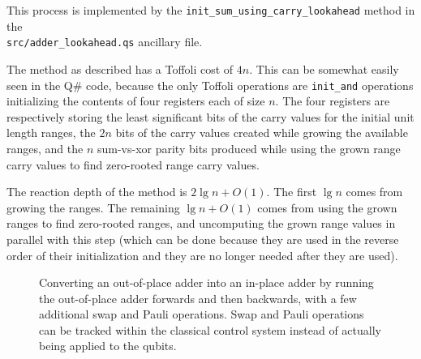 \documentclass[onecolumn,unpublished]{quantumarticle}
\theoremstyle{definition}
\theoremstyle{definition}
\theoremstyle{definition}
\begin{document}
This process is implemented by the \texttt{init\_sum\_using\_carry\_lookahead} method in the \\\texttt{src/adder\_lookahead.qs} ancillary file.

The method as described has a Toffoli cost of $4n$.
This can be somewhat easily seen in the Q\# code, because the only Toffoli operations are \texttt{init\_and} operations initializing the contents of four registers each of size $n$.
The four registers are respectively storing the least significant bits of the carry values for the initial unit length ranges, the $2n$ bits of the carry values created while growing the available ranges, and the $n$ sum-vs-xor parity bits produced while using the grown range carry values to find zero-rooted range carry values.

The reaction depth of the method is $2 \lg n + O(1)$.
The first $\lg n$ comes from growing the ranges.
The remaining $\lg n + O(1)$ comes from using the grown ranges to find zero-rooted ranges, and uncomputing the grown range values in parallel with this step (which can be done because they are used in the reverse order of their initialization and they are no longer needed after they are used).

\begin{figure}
\centering
{}
    \caption{
        Converting an out-of-place adder into an in-place adder by running the out-of-place adder forwards and then backwards, with a few additional swap and Pauli operations.
        Swap and Pauli operations can be tracked within the classical control system instead of actually being applied to the qubits.
    }
    \label{fig:oop2ip}
\end{figure}
\end{document}
